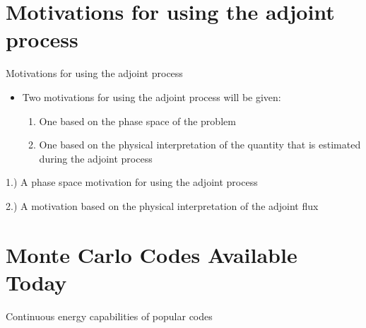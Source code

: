 \documentclass{beamer}
\begin{document}
\section{Motivations for using the adjoint process}
\begin{frame}{Motivations for using the adjoint process}

\begin{itemize}
  \item Two motivations for using the adjoint process will be given:
    \begin{enumerate}
      \item One based on the phase space of the problem
      \item One based on the physical interpretation of the quantity that is 
        estimated during the adjoint process
    \end{enumerate}
\end{itemize}

\end{frame}

\begin{frame}{1.) A phase space motivation for using the adjoint process}

\end{frame}

\begin{frame}{2.) A motivation based on the physical interpretation of the adjoint flux}

\end{frame}

\section{Monte Carlo Codes Available Today}
\begin{frame}{Continuous energy capabilities of popular codes}

\end{frame}

\end{document}
